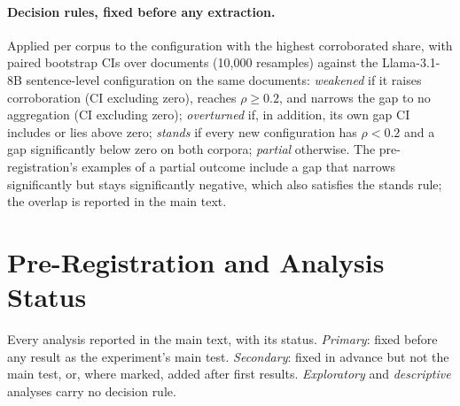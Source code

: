 \documentclass[11pt]{article}
\begin{document}
\paragraph{Decision rules, fixed before any extraction.} Applied per
corpus to the configuration with the highest corroborated share, with
paired bootstrap CIs over documents (10,000 resamples) against the
Llama-3.1-8B sentence-level configuration on the same documents:
\emph{weakened} if it raises corroboration (CI excluding zero), reaches
$\rho \ge 0.2$, and narrows the gap to no aggregation (CI excluding
zero); \emph{overturned} if, in addition, its own gap CI includes or
lies above zero; \emph{stands} if every new configuration has
$\rho < 0.2$ and a gap significantly below zero on both corpora;
\emph{partial} otherwise. The pre-registration's examples of a partial
outcome include a gap that narrows significantly but stays
significantly negative, which also satisfies the stands rule; the
overlap is reported in the main text.

\section{Pre-Registration and Analysis Status}
\label{sec:s12}

Every analysis reported in the main text, with its status. \emph{Primary}:
fixed before any result as the experiment's main test. \emph{Secondary}:
fixed in advance but not the main test, or, where marked, added after
first results. \emph{Exploratory} and \emph{descriptive} analyses carry
no decision rule.
\end{document}
